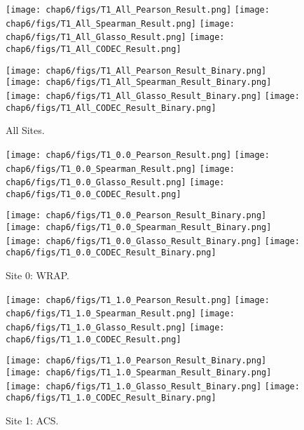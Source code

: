 \begin{figure}
    \centering
    \texttt{[image: chap6/figs/T1\_All\_Pearson\_Result.png]}
    \texttt{[image: chap6/figs/T1\_All\_Spearman\_Result.png]}
    \texttt{[image: chap6/figs/T1\_All\_Glasso\_Result.png]}
    \texttt{[image: chap6/figs/T1\_All\_CODEC\_Result.png]}
    
    \texttt{[image: chap6/figs/T1\_All\_Pearson\_Result\_Binary.png]}
    \texttt{[image: chap6/figs/T1\_All\_Spearman\_Result\_Binary.png]}
    \texttt{[image: chap6/figs/T1\_All\_Glasso\_Result\_Binary.png]}
    \texttt{[image: chap6/figs/T1\_All\_CODEC\_Result\_Binary.png]}
    \caption{All Sites.}
    \label{fig:all}
\end{figure}

\begin{figure}
    \centering
    \texttt{[image: chap6/figs/T1\_0.0\_Pearson\_Result.png]}
    \texttt{[image: chap6/figs/T1\_0.0\_Spearman\_Result.png]}
    \texttt{[image: chap6/figs/T1\_0.0\_Glasso\_Result.png]}
    \texttt{[image: chap6/figs/T1\_0.0\_CODEC\_Result.png]}
    
    \texttt{[image: chap6/figs/T1\_0.0\_Pearson\_Result\_Binary.png]}
    \texttt{[image: chap6/figs/T1\_0.0\_Spearman\_Result\_Binary.png]}
    \texttt{[image: chap6/figs/T1\_0.0\_Glasso\_Result\_Binary.png]}
    \texttt{[image: chap6/figs/T1\_0.0\_CODEC\_Result\_Binary.png]}
    \caption{Site 0: WRAP.}
    \label{fig:site0}
\end{figure}

\begin{figure}
    \centering
    \texttt{[image: chap6/figs/T1\_1.0\_Pearson\_Result.png]}
    \texttt{[image: chap6/figs/T1\_1.0\_Spearman\_Result.png]}
    \texttt{[image: chap6/figs/T1\_1.0\_Glasso\_Result.png]}
    \texttt{[image: chap6/figs/T1\_1.0\_CODEC\_Result.png]}
    
    \texttt{[image: chap6/figs/T1\_1.0\_Pearson\_Result\_Binary.png]}
    \texttt{[image: chap6/figs/T1\_1.0\_Spearman\_Result\_Binary.png]}
    \texttt{[image: chap6/figs/T1\_1.0\_Glasso\_Result\_Binary.png]}
    \texttt{[image: chap6/figs/T1\_1.0\_CODEC\_Result\_Binary.png]}
    \caption{Site 1: ACS.}
    \label{fig:site1}
\end{figure}

